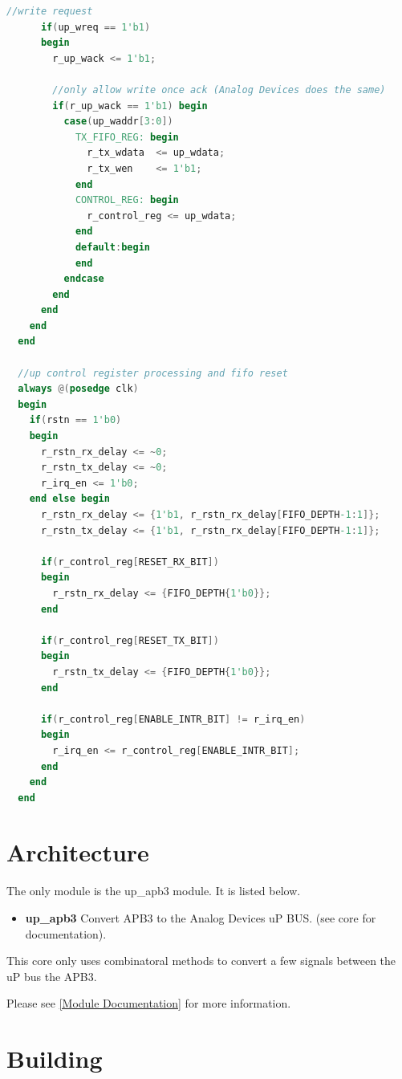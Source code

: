 \begin{lstlisting}[language=Verilog]
      //write request
      if(up_wreq == 1'b1)
      begin
        r_up_wack <= 1'b1;

        //only allow write once ack (Analog Devices does the same)
        if(r_up_wack == 1'b1) begin
          case(up_waddr[3:0])
            TX_FIFO_REG: begin
              r_tx_wdata  <= up_wdata;
              r_tx_wen    <= 1'b1;
            end
            CONTROL_REG: begin
              r_control_reg <= up_wdata;
            end
            default:begin
            end
          endcase
        end
      end
    end
  end

  //up control register processing and fifo reset
  always @(posedge clk)
  begin
    if(rstn == 1'b0)
    begin
      r_rstn_rx_delay <= ~0;
      r_rstn_tx_delay <= ~0;
      r_irq_en <= 1'b0;
    end else begin
      r_rstn_rx_delay <= {1'b1, r_rstn_rx_delay[FIFO_DEPTH-1:1]};
      r_rstn_tx_delay <= {1'b1, r_rstn_rx_delay[FIFO_DEPTH-1:1]};

      if(r_control_reg[RESET_RX_BIT])
      begin
        r_rstn_rx_delay <= {FIFO_DEPTH{1'b0}};
      end

      if(r_control_reg[RESET_TX_BIT])
      begin
        r_rstn_tx_delay <= {FIFO_DEPTH{1'b0}};
      end

      if(r_control_reg[ENABLE_INTR_BIT] != r_irq_en)
      begin
        r_irq_en <= r_control_reg[ENABLE_INTR_BIT];
      end
    end
  end
\end{lstlisting}

\section{Architecture}
\par
The only module is the up\_apb3 module. It is listed below.

\begin{itemize}
  \item \textbf{up\_apb3} Convert APB3 to the Analog Devices uP BUS. (see core for documentation).
\end{itemize}

\par
This core only uses combinatoral methods to convert a few signals between the uP bus the APB3.

Please see \ref{Module Documentation} for more information.

\section{Building}


